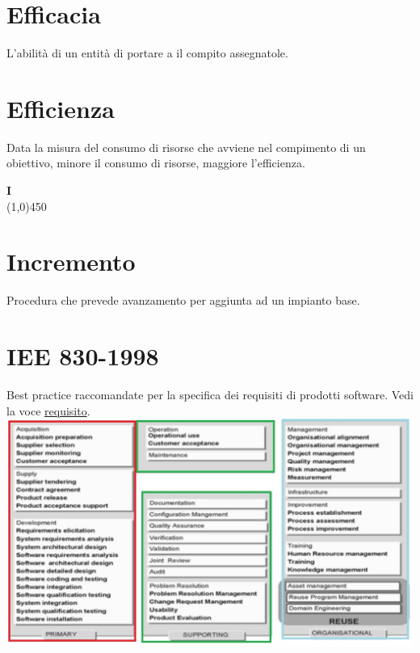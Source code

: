 \documentclass[11pt]{article}
\begin{document}
	\section{\LARGE Efficacia}
	\label{sec:efficacia}
	L'abilità di un entità di portare a il compito assegnatole.
	
	\section{\LARGE Efficienza}
	\label{sec:efficienza}
	Data la misura del consumo di risorse che avviene nel compimento di un obiettivo, minore il consumo di risorse, maggiore l'efficienza.\newpage

	{\Huge{\textbf{I}}} \\
	\line(1,0){450}

	\section{\LARGE Incremento}
	\label{sec:incremento}
	Procedura che prevede avanzamento per aggiunta ad un impianto base.

	\section{\LARGE IEE 830-1998}
	\label{sec:iee830}
	Best practice raccomandate per la specifica dei requisiti di prodotti software. Vedi la voce \hyperref[sec:requisito]{requisito}.
	\linebreak
	\includegraphics[scale=0.5]{iso12250.jpg}
\end{document}
